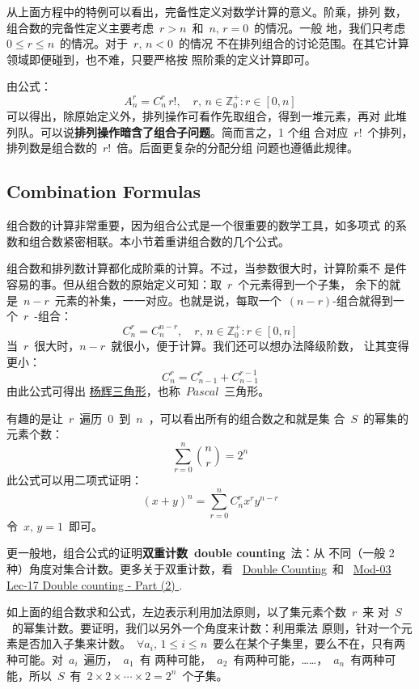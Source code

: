 从上面方程中的特例可以看出，完备性定义对数学计算的意义。阶乘，排列
数，组合数的完备性定义主要考虑~$r > n$~和~$n,\, r = 0$~的情况。一般
地，我们只考虑~$0 \leq r \leq n$~的情况。对于~$r,\, n < 0$~的情况
不在排列组合的讨论范围。在其它计算领域即便碰到，也不难，只要严格按
照阶乘的定义计算即可。

由公式：
\[ A_n^r = C_n^r\, r!,\quad r,\, n \in \mathbb{Z}_0^{+}: r \in [0,
  n] \]
可以得出，除原始定义外，排列操作可看作先取组合，得到一堆元素，再对
此堆列队。可以说\textbf{排列操作暗含了组合子问题}。简而言之，1 个组
合对应~$r!$~个排列，排列数是组合数的~$r!$~倍。后面更复杂的分配分组
问题也遵循此规律。

\subsection{Combination Formulas}
\label{sec:combination-formulas}

组合数的计算非常重要，因为组合公式是一个很重要的数学工具，如多项式
的系数和组合数紧密相联。本小节着重讲组合数的几个公式。

组合数和排列数计算都化成阶乘的计算。不过，当参数很大时，计算阶乘不
是件容易的事。但从组合数的原始定义可知：取~$r$~个元素得到一个子集，
余下的就是~$n - r$~元素的补集，一一对应。也就是说，每取一个~$(n -
r)$-组合就得到一个~$r$~-组合：
\[ C_n^r = C_n^{n - r}, \quad r,\, n \in \mathbb{Z}_0^{+}: r \in [0,
  n] \]
当~$r$~很大时，$n - r$~就很小，便于计算。我们还可以想办法降级阶数，
让其变得更小：
\[ C_n^r = C_{n - 1}^r + C_{n - 1}^{r - 1} \]
由此公式可得出
\href{https://zh.wikipedia.org/zh-hans/\%E6\%9D\%A8\%E8\%BE\%89\%E4\%B8\%89\%E8\%A7\%92\%E5\%BD\%A2}{
  杨辉三角形}，也称~$Pascal$~三角形。

有趣的是让~$r$~遍历~$0$~到~$n$~，可以看出所有的组合数之和就是集
合~$S$~的幂集的元素个数：
\[ \sum_{r = 0}^n\binom{n}{r} = 2^n \]
此公式可以用二项式证明：
\[ (x + y)^n = \sum_{r = 0}^nC_n^rx^ry^{n - r}
\]令~$x,\, y = 1$~即可。

更一般地，组合公式的证明\textbf{双重计数~double counting}~法：从
不同（一般 2 种）角度对集合计数。更多关于双重计数，看~
\href{https://brilliant.org/wiki/double-counting-definition/}{Double
  Counting}~和
~\href{https://www.youtube.com/watch?v=TdtFxXo2zpg}{Mod-03 Lec-17
  Double counting - Part (2) }.

如上面的组合数求和公式，左边表示利用加法原则，以了集元素个数~$r$~来
对~$S$~的幂集计数。要证明，我们以另外一个角度来计数：利用乘法
原则，针对一个元素是否加入子集来计数。~$\forall a_i,\, 1 \leq i \leq
n$~要么在某个子集里，要么不在，只有两种可能。对~$a_i$~遍历，~$a_1$~有
两种可能，~$a_2$~有两种可能，……，~$a_n$~有两种可能，所以~$S$~有~$2
\times 2 \times \cdots \times 2 = 2^n$~个子集。

